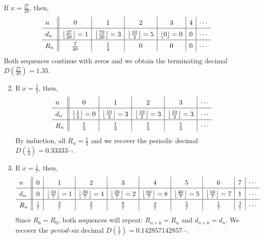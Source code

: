\begin{examples*}{}{}
	\exstart If $x=\frac{27}{20}$, then,
  \[
  	\def\arraystretch{1.4}
  	\begin{array}{l||c|c|c|c|c|c}
  		n & 0 & 1 & 2 & 3 & 4 & \cdots \\\hline
  		d_n & \left\lfloor\frac{27}{20}\right\rfloor=1 
  			& \left\lfloor\frac{70}{20}\right\rfloor=3 
  			& \left\lfloor\frac{10}{2}\right\rfloor=5 
  			& \left\lfloor 0\right\rfloor=0 
  			& 0 & \cdots \\\hline
 	 		R_n & \frac 7{20} & \frac{1}{2} & 0 & 0 & 0 & \cdots
  	\end{array}
  \]
  Both sequences continue with zeros and we obtain the terminating decimal $D(\frac{27}{20})=1.35$.
  
  \begin{enumerate}\setcounter{enumi}{1}
		\item If $x=\frac 13$, then,
		\[
			\def\arraystretch{1.4}
			\begin{array}{l||c|c|c|c|c}
	  		n & 0 & 1 & 2 & 3 & \cdots\\\hline
	  		d_n & \left\lfloor\frac{1}{3}\right\rfloor=0 
	  			& \left\lfloor\frac{10}3\right\rfloor=3 
	  			& \left\lfloor\frac{10}3\right\rfloor=3 
	  			& \left\lfloor\frac{10}3\right\rfloor=3 
	  			& \cdots \\\hline
	  		R_n & \frac 13 & \frac 13 & \frac 13 & \frac 13 & \cdots
	  	\end{array}
	  \]
	  By induction, all $R_n=\frac 13$ and we recover the periodic decimal $D(\frac 13)=0.33333\cdots$.
	  
	  \item If $x=\frac 17$, then,
	  \[
	  	\def\arraystretch{1.4}
	  	\begin{array}{l||c|c|c|c|c|c|c|c|c}
	  		n & 0 & 1 & 2 & 3 & 4 & 5 & 6 & 7 & \cdots \\\hline
	  		d_n & 0 & \left\lfloor\frac{10}7\right\rfloor=1 
	  			& \left\lfloor\frac{30}7\right\rfloor=4 
	  			& \left\lfloor\frac{20}7\right\rfloor=2 
	  			& \left\lfloor\frac{60}7\right\rfloor=8 
	  			& \left\lfloor\frac{40}7\right\rfloor=5 
	  			& \left\lfloor\frac{50}7\right\rfloor=7 
	  			& 1 & \cdots \\\hline
	  		R_n & \frac 17 & \frac 37 & \frac 27 & \frac 67 & \frac 47 
	  			& \frac 57 & \frac 17 & \frac 37 & \cdots
	   \end{array}
	  \]
	  Since $R_6=R_0$, both sequences will repeat: $R_{n+6}=R_n$ and $d_{n+6}=d_n$. We recover the \emph{period-six} decimal $D(\frac 17)=0.142857142857\cdots$.
	\end{enumerate}
\end{examples*}



